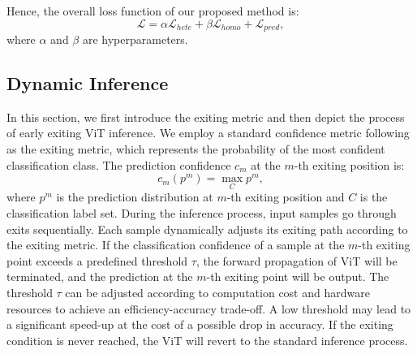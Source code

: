 Hence, the overall loss function of our proposed method is:
\begin{equation}
  \mathcal{L} = \alpha \mathcal{L}_{hete} + \beta \mathcal{L}_{homo} + \mathcal{L}_{pred}, 
\end{equation}
where $\alpha$ and $\beta$ are hyperparameters. 


\subsection{Dynamic Inference}
In this section, we first introduce the exiting metric and then depict the process of early exiting ViT inference. 
We employ a standard confidence metric following \cite{ztw} as the exiting metric, which represents the probability of the most confident classification class. 
The prediction confidence $c_m$ at the $m$-th exiting position is:
\begin{equation}
  c_m(p^m)= \mathop{max}\limits_{C }p^m,
\end{equation}
where $p^m$ is the prediction distribution at $m$-th exiting position and $C$ is the classification label set. 
During the inference process, input samples go through exits sequentially. 
Each sample dynamically adjusts its exiting path according to the exiting metric. 
If the classification confidence of a sample at the $m$-th exiting point exceeds a predefined threshold $\tau$, the forward propagation of ViT will be terminated, 
and the prediction at the $m$-th exiting point will be output. 
The threshold $\tau$ can be adjusted according to computation cost and hardware resources to achieve an efficiency-accuracy trade-off. 
A low threshold may lead to a significant speed-up at the cost of a possible drop in accuracy.
If the exiting condition is never reached, the ViT will revert to the standard inference process. 


